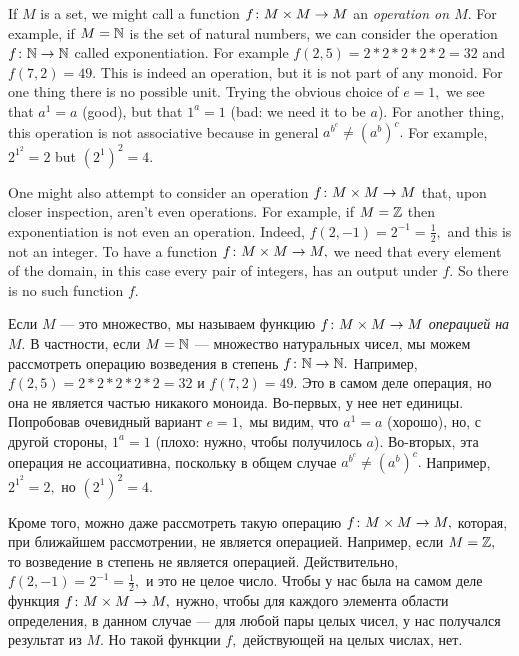 \documentclass[CT4S-EN-RU]{subfiles}
\begin{document}
\begin{exampleENG}
If $M$ is a set, we might call a function $f\colon M\times M\rightarrow M$ an {\em operation on $M$}. For example, if $M={\mathbb N}$ is the set of natural numbers, we can consider the operation $f\colon{\mathbb N}\rightarrow{\mathbb N}$ called exponentiation. For example $f(2,5)=2*2*2*2*2=32$ and $f(7,2)=49.$ This is indeed an operation, but it is not part of any monoid. For one thing there is no possible unit. Trying the obvious choice of $e=1,$ we see that $a^1=a$ (good), but that $1^a=1$ (bad: we need it to be $a$). For another thing, this operation is not associative because in general $a^{b^c}\neq (a^b)^c.$ For example, $2^{1^2}=2$ but $(2^1)^2=4.$

One might also attempt to consider an operation $f\colon M\times M\rightarrow M$ that, upon closer inspection, aren't even operations. For example, if $M={\mathbb Z}$ then exponentiation is not even an operation. Indeed, $f(2,-1)=2^{-1}=\frac{1}{2},$ and this is not an integer. To have a function $f\colon M\times M\rightarrow M,$ we need that every element of the domain, in this case every pair of integers, has an output under $f.$ So there is no such function $f.$
\end{exampleENG}

\begin{exampleRUS}[Не моноид]
Если $M$ — это множество, мы называем функцию $f\colon M\times M\rightarrow M$ {\em операцией на $M$}. В частности, если $M={\mathbb N}$ — множество натуральных чисел, мы можем рассмотреть операцию возведения в степень $f\colon{\mathbb N}\rightarrow{\mathbb N}.$ Например, $f(2,5)=2*2*2*2*2=32$ и $f(7,2)=49.$ Это в самом деле операция, но она не является частью никакого моноида. Во-первых, у нее нет единицы. Попробовав очевидный вариант $e=1,$ мы видим, что $a^1=a$ (хорошо), но, с другой стороны, $1^a=1$ (плохо: нужно, чтобы получилось $a$). Во-вторых, эта операция не ассоциативна, поскольку в общем случае $a^{b^c}\neq (a^b)^c.$ Например, $2^{1^2}=2,$ но $(2^1)^2=4.$

Кроме того, можно даже рассмотреть такую операцию $f\colon M\times M\rightarrow M,$ которая, при ближайшем рассмотрении, не является операцией. Например, если $M={\mathbb Z},$ то возведение в степень не является операцией. Действительно, $f(2,-1)=2^{-1}=\frac{1}{2},$ и это не целое число. Чтобы у нас была на самом деле функция $f\colon M\times M\rightarrow M,$ нужно, чтобы для каждого элемента области определения, в данном случае — для любой пары целых чисел, у нас получался результат из $M.$ Но такой функции $f,$ действующей на целых числах, нет.
\end{exampleRUS}
\end{document}
